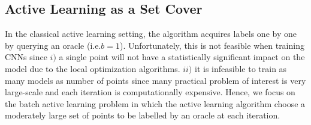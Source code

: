 \documentclass{article} %
\makeatletter
\newcommand*{\ie}{i.e.\@\xspace}
\makeatother
\begin{document}
\subsection{Active Learning as a Set Cover} 
In the classical active learning setting, the algorithm acquires
labels one by one by querying an oracle (\ie $b=1$). Unfortunately, this is not feasible when training CNNs since $i)$
a single point will not have a statistically significant impact on the model due to the local optimization algorithms.
$ii)$ it is infeasible to train as many models as number of points since many practical problem of interest is very
large-scale and each iteration is computationally expensive. Hence, we focus on the batch active learning problem in
which the active learning algorithm choose a moderately large set of points to be labelled by an oracle at each
iteration.
\end{document}

